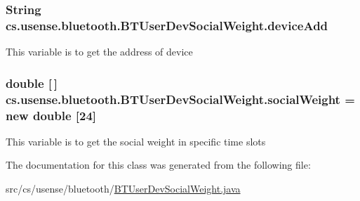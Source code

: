 \subsubsection[{device\+Add}]{\setlength{\rightskip}{0pt plus 5cm}String cs.\+usense.\+bluetooth.\+B\+T\+User\+Dev\+Social\+Weight.\+device\+Add\hspace{0.3cm}{\ttfamily [private]}}\label{classcs_1_1usense_1_1bluetooth_1_1_b_t_user_dev_social_weight_a59a30a9bd750dafcdcb1eeeb562cb852}
This variable is to get the address of device \hypertarget{classcs_1_1usense_1_1bluetooth_1_1_b_t_user_dev_social_weight_a2a5ca3be8acdc4df6aed63db79524f78}{}
\subsubsection[{social\+Weight}]{\setlength{\rightskip}{0pt plus 5cm}double \mbox{[}$\,$\mbox{]} cs.\+usense.\+bluetooth.\+B\+T\+User\+Dev\+Social\+Weight.\+social\+Weight = new double \mbox{[}24\mbox{]}\hspace{0.3cm}{\ttfamily [private]}}\label{classcs_1_1usense_1_1bluetooth_1_1_b_t_user_dev_social_weight_a2a5ca3be8acdc4df6aed63db79524f78}
This variable is to get the social weight in specific time slots 

The documentation for this class was generated from the following file\+:\begin{DoxyCompactItemize}
\item 
src/cs/usense/bluetooth/\hyperlink{_b_t_user_dev_social_weight_8java}{B\+T\+User\+Dev\+Social\+Weight.\+java}\end{DoxyCompactItemize}
